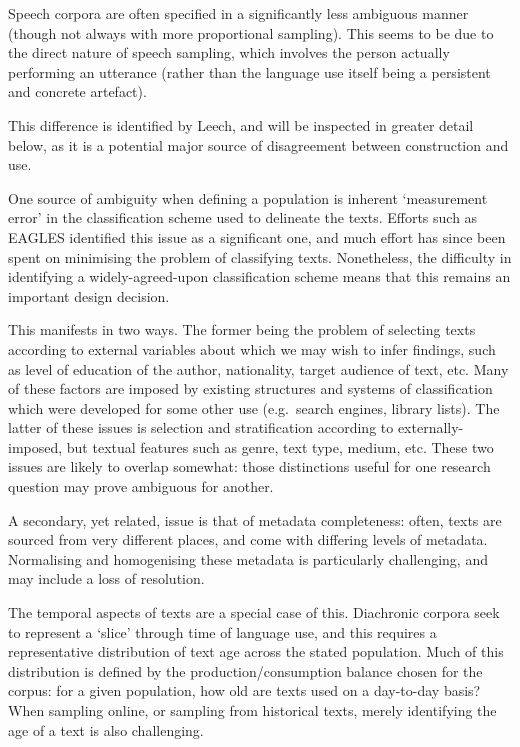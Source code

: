 
Speech corpora are often specified in a significantly less ambiguous manner (though not always with more proportional sampling). This seems to be due to the direct nature of speech sampling, which involves the person actually performing an utterance (rather than the language use itself being a persistent and concrete artefact).

This difference is identified by Leech\cite{leech2006new}, and will be inspected in greater detail below, as it is a potential major source of disagreement between construction and use. %



One source of ambiguity when defining a population is inherent `measurement error' in the classification scheme used to delineate the texts.
Efforts such as EAGLES\cite{EagTcwgCtypeaglespreliminary} identified this issue as a significant one, and much effort has since been spent on minimising the problem of classifying texts.  Nonetheless, the difficulty in identifying a widely-agreed-upon classification scheme means that this remains an important design decision.

This manifests in two ways. The former being the problem of selecting texts according to external variables about which we may wish to infer findings, such as level of education of the author, nationality, target audience of text, etc.  Many of these factors are imposed by existing structures and systems of classification which were developed for some other use (e.g.\ search engines, library lists).  The latter of these issues is selection and stratification according to externally-imposed, but textual features such as genre, text type, medium, etc.  These two issues are likely to overlap somewhat: those distinctions useful for one research question may prove ambiguous for another.

A secondary, yet related, issue is that of metadata completeness: often, texts are sourced from very different places, and come with differing levels of metadata.  Normalising and homogenising these metadata is particularly challenging, and may include a loss of resolution.

The temporal aspects of texts are a special case of this.  Diachronic corpora seek to represent a `slice' through time of language use, and this requires a representative distribution of text age across the stated population.  Much of this distribution is defined by the production/consumption balance chosen for the corpus: for a given population, how old are texts used on a day-to-day basis?  When sampling online, or sampling from historical texts, merely identifying the age of a text is also challenging.

